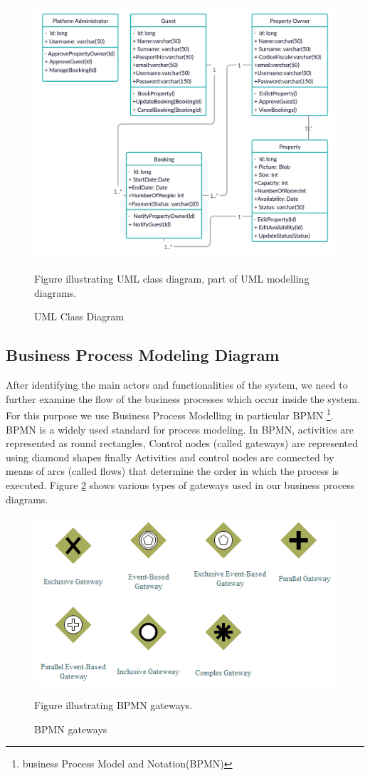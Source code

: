 \begin{figure} 
\centering
\includegraphics[width=12cm]{pictures/UML_class_diagram.png}
\caption{UML Class Diagram}
Figure illustrating UML class diagram, part of UML modelling diagrams.
\label{fig:uml_class_model}
\end{figure}
 
\subsection{Business Process Modeling Diagram}
After identifying the main actors and functionalities of the system, we need to further examine the flow of the business processes which occur inside the system. For this purpose we use Business Process Modelling in particular BPMN \footnote{business Process Model and Notation(BPMN)}.
BPMN is a widely used standard for process modeling. In BPMN, activities are represented as round rectangles, Control nodes (called gateways) are represented using diamond shapes finally Activities and control nodes are connected by means of arcs (called flows) that determine the order in which the process is executed.
Figure \ref{fig:bpmn_notion_pic} shows various types of gateways used in our business process diagrams.

\begin{figure} 
\centering
\includegraphics[width=14cm]{pictures/BPMN_NOTION2.png}
\caption{BPMN gateways}
Figure illustrating BPMN gateways.
\label{fig:bpmn_notion_pic}
\end{figure}


